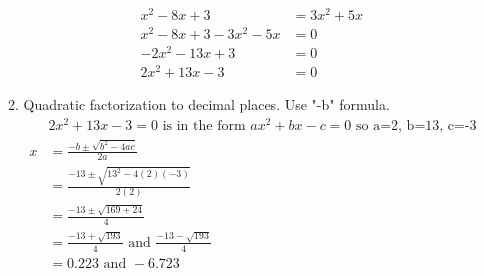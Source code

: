 \documentclass[11pt]{article}
\begin{document}
\begin{enumerate}
\begin{enumerate}
\begin{equation*}
\begin{split}
                        x^2-8x+3&=3x^2+5x\\
                        x^2-8x+3-3x^2-5x&=0\\
                        -2x^2-13x+3&=0\\
                        2x^2+13x-3&=0
                    \end{split}
                \end{equation*}
            \item Quadratic factorization to decimal places. Use "-b" formula.
                \begin{equation*}
                    \begin{split}
                        &2x^2+13x-3=0\text{ is in the form }ax^2+bx-c=0\text{ so a=2, b=13, c=-3}\\
                        x&=\frac{-b\pm\sqrt{b^2-4ac}}{2a}\\
                        &=\frac{-13\pm\sqrt{13^2-4(2)(-3)}}{2(2)}\\
                        &=\frac{-13\pm\sqrt{169+24}}{4}\\
                        &=\frac{-13+\sqrt{193}}{4}\text{ and }\frac{-13-\sqrt{193}}{4}\\
                        &=0.223\text{ and }-6.723
                    \end{split}
                \end{equation*}
        \end{enumerate}
    \end{enumerate}
\end{document}
